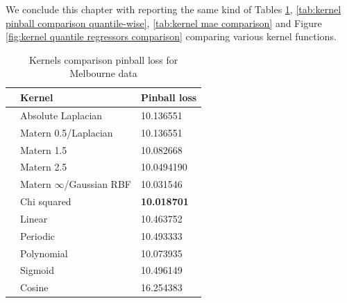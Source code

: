 We conclude this chapter with reporting the same kind of Tables \ref{tab:kernel pinball comparison}, \ref{tab:kernel pinball comparison quantile-wise}, \ref{tab:kernel mae comparison} and Figure \ref{fig:kernel quantile regressors comparison} comparing various kernel functions.

\begin{table}[!h]
    \caption{Kernels comparison pinball loss for Melbourne data}
    \label{tab:kernel pinball comparison}
    \begin{center}
    \begin{tabular}{lll}
        \toprule
        & Kernel & Pinball loss
        \\
        \midrule
        & Absolute Laplacian &  10.136551 \\
        & Matern 0.5/Laplacian & 10.136551  \\
        & Matern 1.5 & 10.082668  \\
        & Matern 2.5 & 10.0494190    \\

        & Matern $\infty$/Gaussian RBF &  10.031546 \\

        & Chi squared & \textbf{10.018701}       \\
        
        & Linear & 10.463752    \\
        & Periodic  & 10.493333\\
        & Polynomial & 10.073935     \\
        & Sigmoid & 10.496149            \\
        & Cosine & 16.254383    \\
        \bottomrule
        \end{tabular}
    \end{center}
    \end{table}
    
